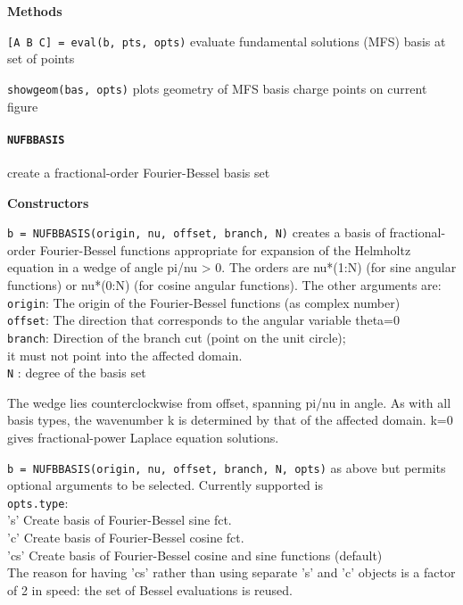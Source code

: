 \textbf{Methods}

{\tt [A B C] = eval(b, pts, opts)} evaluate fundamental solutions
(MFS) basis at set of points

{\tt showgeom(bas, opts)} plots geometry of MFS basis charge points on current figure


\newpage

\paragraph{\tt NUFBBASIS} create a fractional-order Fourier-Bessel
basis set

\textbf{Constructors}


{\tt b = NUFBBASIS(origin, nu, offset, branch, N)} creates a basis of
fractional- 
   order Fourier-Bessel functions appropriate for expansion of the Helmholtz
   equation in a wedge of angle pi/nu > 0. The orders are nu*(1:N) (for sine
   angular functions) or nu*(0:N) (for cosine angular functions). The other
   arguments are:\\ 
     {\tt origin}: The origin of the Fourier-Bessel functions (as complex number)\\
     {\tt offset}: The direction that corresponds to the angular variable theta=0\\
     {\tt branch}: Direction of the branch cut (point on the unit circle);\\
             it must not point into the affected domain.\\
     {\tt N}     : degree of the basis set

   The wedge lies counterclockwise from offset, spanning pi/nu in angle.
   As with all basis types, the wavenumber k is determined by that of the
   affected domain. k=0 gives fractional-power Laplace equation solutions.

 {\tt b = NUFBBASIS(origin, nu, offset, branch, N, opts)} as above but permits
   optional arguments to be selected. Currently supported is\\
         {\tt opts.type}:\\    's'  Create basis of Fourier-Bessel sine fct.\\
                          'c'  Create basis of Fourier-Bessel cosine fct.\\
                          'cs' Create basis of Fourier-Bessel cosine and
                               sine functions (default)\\
   The reason for having 'cs' rather than using separate 's' and 'c' objects
   is a factor of 2 in speed: the set of Bessel evaluations is reused.

